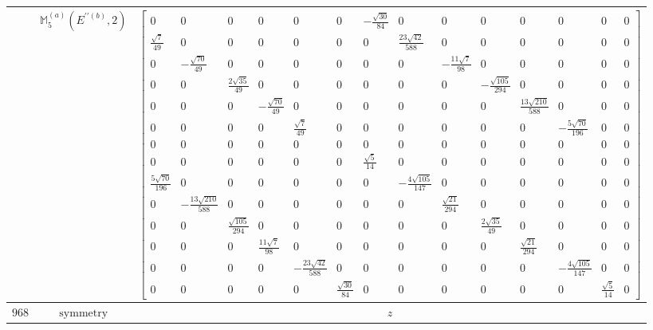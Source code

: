 \documentclass[fleqn,8pt,landscape]{jsarticle}
\begin{document}
\begin{longtable}{ccc}
$  $ & $ \mathbb{M}_{5}^{(a)}(E^{\prime\prime(b)},2) $ & $ \begin{bmatrix} 0 & 0 & 0 & 0 & 0 & 0 & - \frac{\sqrt{30}}{84} & 0 & 0 & 0 & 0 & 0 & 0 & 0 \\ \frac{\sqrt{7}}{49} & 0 & 0 & 0 & 0 & 0 & 0 & \frac{23 \sqrt{42}}{588} & 0 & 0 & 0 & 0 & 0 & 0 \\ 0 & - \frac{\sqrt{70}}{49} & 0 & 0 & 0 & 0 & 0 & 0 & - \frac{11 \sqrt{7}}{98} & 0 & 0 & 0 & 0 & 0 \\ 0 & 0 & \frac{2 \sqrt{35}}{49} & 0 & 0 & 0 & 0 & 0 & 0 & - \frac{\sqrt{105}}{294} & 0 & 0 & 0 & 0 \\ 0 & 0 & 0 & - \frac{\sqrt{70}}{49} & 0 & 0 & 0 & 0 & 0 & 0 & \frac{13 \sqrt{210}}{588} & 0 & 0 & 0 \\ 0 & 0 & 0 & 0 & \frac{\sqrt{7}}{49} & 0 & 0 & 0 & 0 & 0 & 0 & - \frac{5 \sqrt{70}}{196} & 0 & 0 \\ 0 & 0 & 0 & 0 & 0 & 0 & 0 & 0 & 0 & 0 & 0 & 0 & 0 & 0 \\ 0 & 0 & 0 & 0 & 0 & 0 & \frac{\sqrt{5}}{14} & 0 & 0 & 0 & 0 & 0 & 0 & 0 \\ \frac{5 \sqrt{70}}{196} & 0 & 0 & 0 & 0 & 0 & 0 & - \frac{4 \sqrt{105}}{147} & 0 & 0 & 0 & 0 & 0 & 0 \\ 0 & - \frac{13 \sqrt{210}}{588} & 0 & 0 & 0 & 0 & 0 & 0 & \frac{\sqrt{21}}{294} & 0 & 0 & 0 & 0 & 0 \\ 0 & 0 & \frac{\sqrt{105}}{294} & 0 & 0 & 0 & 0 & 0 & 0 & \frac{2 \sqrt{35}}{49} & 0 & 0 & 0 & 0 \\ 0 & 0 & 0 & \frac{11 \sqrt{7}}{98} & 0 & 0 & 0 & 0 & 0 & 0 & \frac{\sqrt{21}}{294} & 0 & 0 & 0 \\ 0 & 0 & 0 & 0 & - \frac{23 \sqrt{42}}{588} & 0 & 0 & 0 & 0 & 0 & 0 & - \frac{4 \sqrt{105}}{147} & 0 & 0 \\ 0 & 0 & 0 & 0 & 0 & \frac{\sqrt{30}}{84} & 0 & 0 & 0 & 0 & 0 & 0 & \frac{\sqrt{5}}{14} & 0 \end{bmatrix} $ \\ \hline
$ 968 $ & $ \text{symmetry} $ & $ z $ \\

\end{longtable}
\end{document}
